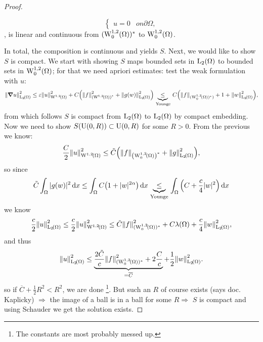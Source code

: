 \documentclass{article}
\begin{document}
\begin{example}
\begin{proof}
\begin{itemize}
\[\begin{cases}
						u = 0 & on \partial \Omega,
					\end{cases}
				\]
				, is linear and continuous from $(\WkpzeroSet[1][2]{\Omega})^{*}$ to $\WkpzeroSet[1][2]{\Omega}$.
		\end{itemize}
		In total, the composition is continuous and yields $S$. Next, we would like to show $S$ is compact. We start with showing $S$ maps bounded sets in $\LpSet[2]{\Omega}$ to bounded sets in $\WkpzeroSet[1][2]{\Omega}$; for that we need apriori estimates: test the weak formulation with $u$:
		\[
			\norm{\grad u}_{\LpSet[2]{\Omega}}^{2} \leq \varepsilon \norm{u}_{\WkpSet[1][2]{\Omega}}^{2} + C\qty(\norm{f}_{\qty(\WkpSet[1][2]{\Omega})^{*}}^{2}+\norm{g(w)}_{\LpSet[2]{\Omega}}^{2}) \underbrace{\leq}_{\, \text{Younge}} \,C\qty(\norm{f}_{(\WkpzeroSet[1][2]{\Omega})^{*})}+1+\norm{w}_{\LpSet[2]{\Omega}}^{2}),
		\]
		from which follows $S$ is compact from $\LpSet[2]{\Omega}$ to $\LpSet[2]{\Omega}$ by compact embedding. Now we need to show $S\qty(\text{U}(0,R)) \subset \text{U}(0,R)$ for some $R>0.$ From the previous we know:
		\[
			\frac{C}{2}\norm{u}_{\WkpSet[1][2]{\Omega}}^{2} \leq \tilde{C}\qty(\norm{f}_{\qty(\WkpzeroSet[1][2]{\Omega})^{*}}+\norm{g}_{\LpSet[2]{\Omega}}^{2}),
		\]
		so since
		\[
			\tilde{C}\int_{\Omega}|g(w)|^{2}\dd{x} \leq \int_{\Omega}C\qty(1+|w|^{2 \alpha})\dd{x} \underbrace{\leq}_{\, \text{Younge} \,} \int_{\Omega}\qty(C+ \frac{c}{4}|w|^{2})\dd{x}
		\]
		we know
		\[
			\frac{c}{2}\norm{u}_{\LpSet[2]{\Omega}}^{2} \leq \frac{c}{2} \norm{u}_{\WkpSet[1][2]{\Omega}}^{2} \leq \tilde{C}\norm{f}_{(\WkpzeroSet[1][2]{\Omega})^{*}}^{2}+C \lambda\qty(\Omega)+ \frac{c}{4}\norm{w}_{\LpSet[2]{\Omega}}^{2},
		\]
		and thus
		\[
			\norm{u}_{\LpSet[2]{\Omega}}^{2} \leq \underbrace{\frac{2 \tilde{C}}{c} \norm{f}_{(\WkpzeroSet[1][2]{\Omega})^{*}}^{2} + 2 \frac{C}{c}}_{=\overline{C}}+\frac{1}{2}\norm{w}_{\LpSet[2]{\Omega}}^{2}.
		\]
		so if $\overline{C} + \frac{1}{2}R^{2}<R^{2}$, we are done \footnote{The constants are most probably messed up.}. But such an $R$ of course exists (says doc. Kaplicky) $\Rightarrow$ the image of a ball is in a ball for some $R \Rightarrow$ $S$ is compact and using Schauder we get the solution exists.


\end{proof}
\end{example}
\end{document}
